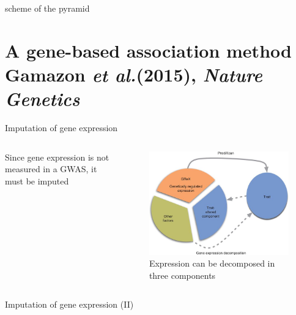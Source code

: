 \documentclass[aspectratio=169,12pt]{beamer}
\newcommand{\etal}{\textit{et al.}\xspace}
\begin{document}
\begin{frame}

	scheme of the pyramid

\end{frame}

\section{A gene-based association method \newline
\scriptsize Gamazon \etal (2015), \textit{Nature Genetics}}

\begin{frame}{Imputation of gene expression}

	\begin{columns}
		\begin{column}{0.4\textwidth}
			Since gene expression is not measured in a GWAS, it must be 
imputed
		\end{column}

		\begin{column}{0.6\textwidth}
			\begin{figure}
				\includegraphics[width=\textwidth]{gamazon2015/1-expression_decomposition}
				\caption{Expression can be decomposed in three 
components}
			\end{figure}
		\end{column}
	\end{columns}

\end{frame}

\begin{frame}{Imputation of gene expression (II)}

	

\end{frame}
\end{document}

